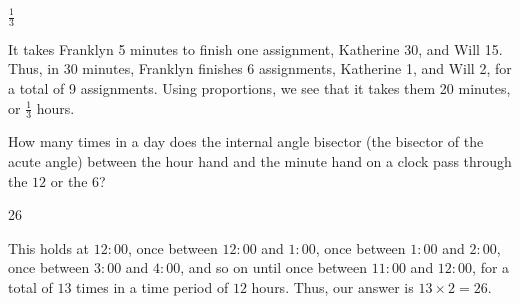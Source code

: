 \documentclass[11pt]{article}
\begin{document}
\begin{answer}
$\frac{1}{3}$
\end{answer}

\begin{solution}
It takes Franklyn 5 minutes to finish one assignment, Katherine 30, and Will 15. Thus, in 30 minutes, Franklyn finishes 6 assignments, Katherine 1, and Will 2, for a total of 9 assignments. Using proportions, we see that it takes them 20 minutes, or $\boxed{\frac{1}{3}}$ hours.
\end{solution}


\begin{problem}
How many times in a day does the internal angle bisector (the bisector of the acute angle) between the hour hand and the minute hand on a clock pass through the $12$ or the $6$?
\end{problem}

\begin{answer}
26
\end{answer}

\begin{solution}
This holds at $12:00$, once between $12:00$ and $1:00$, once between $1:00$ and $2:00$, once between $3:00$ and $4:00$, and so on until once between $11:00$ and $12:00$, for a total of $13$ times in a time period of $12$ hours. Thus, our answer is $13 \times 2 = \boxed{26}$.
\end{solution}
\end{document}
